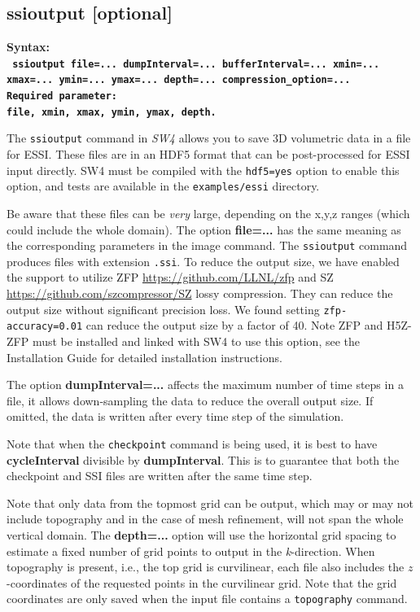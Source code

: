 \documentclass[11pt]{report}
\begin{document}
{\subsection{ssioutput [optional]}
\label{keyword:ssioutput}
\begin{flushleft}
	\bf Syntax:\\ \tt
	ssioutput file=... dumpInterval=... bufferInterval=... xmin=... xmax=... ymin=... ymax=... depth=... compression\_option=...\\
	\bf Required parameter:\\
	file, xmin, xmax, ymin, ymax, depth.
\end{flushleft}
%
The \verb+ssioutput+ command in \emph{SW4} allows you to save 3D volumetric
data in a file for ESSI.
These files are in an HDF5 format that can be post-processed for ESSI input directly.
SW4 must be compiled with the {\tt hdf5=yes} option to enable this option,
and tests are available in the {\tt examples/essi} directory.

Be aware that these files can be {\em very} large, depending on the
x,y,z ranges (which could include the whole domain).
The option {\bf file=...} has the
same meaning as the corresponding parameters in the image command.
The \verb+ssioutput+ command produces files with extension \verb+.ssi+.
To reduce the output size, we have enabled the support to utilize ZFP \url{https://github.com/LLNL/zfp} and SZ \url{https://github.com/szcompressor/SZ} lossy compression. They can reduce the output size without significant precision loss. We found setting \verb+zfp-accuracy=0.01+ can reduce the output size by a factor of 40. Note ZFP and H5Z-ZFP must be installed and linked with SW4 to use this option, see the Installation Guide for detailed installation instructions.


The option {\bf dumpInterval=...} affects the maximum
number of time steps in a file, it allows down-sampling the data to reduce the overall output size. If omitted, the data is written after every time step of the simulation.

Note that when the \verb+checkpoint+ command is being used, it is best to have {\bf cycleInterval} divisible by  {\bf dumpInterval}. This is to guarantee that both the checkpoint and SSI files are written after the same time step.

Note that only data from the topmost grid can be output, which may or may
not include topography and in the case of mesh refinement, will not
span the whole vertical domain.
The {\bf depth=...} option will use the horizontal grid spacing to estimate a
fixed number of grid points to output in the {\emph k-}direction.
When topography is present, i.e., the top grid is curvilinear, each file also
includes the $z$-coordinates of the requested points in the curvilinear grid.
Note that the grid coordinates are only saved when the
input file contains a \verb+topography+ command.

}
\end{document}
